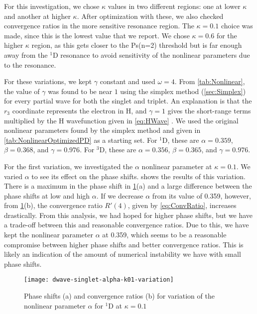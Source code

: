 \documentclass[Dissertation.tex]{subfiles}
\begin{document}
For this investigation, we chose $\kappa$ values in two different regions:
one at lower $\kappa$ and another at higher $\kappa$. After optimization with
these, we also checked convergence ratios in the more sensitive resonance
region. The $\kappa = 0.1$ choice
was made, since this is the lowest value that we report. We chose $\kappa = 0.6$
for the higher $\kappa$ region, as this gets closer to the Ps(n=2) threshold
but is far enough away from the $^1$D resonance to avoid sensitivity of the
nonlinear parameters due to the resonance.

For these variations, we kept $\gamma$ constant and used $\omega = 4$. From 
\cref{tab:Nonlinear}, the value of $\gamma$ was found to be near $1$ using 
the simplex method (\cref{sec:Simplex}) for every partial wave for both the 
singlet and triplet. An explanation is that the $r_3$ coordinate represents 
the electron in H, and $\gamma = 1$ gives the short-range terms multiplied by 
the H wavefunction given in \cref{eq:HWave} \cite{VanReethPrivate}. We used the
original nonlinear parameters found by the simplex method and given in
\cref{tab:NonlinearOptimizedPD} as a starting set. For
$^1$D, these are $\alpha = 0.359$, $\beta = 0.368$, and $\gamma = 0.976$. For
$^3$D, these are $\alpha = 0.356$, $\beta = 0.365$, and $\gamma = 0.976$.

For the first variation, we investigated the $\alpha$ nonlinear parameter at
$\kappa = 0.1$. We varied $\alpha$ to see its effect on the phase shifts.
 shows the results of this
variation. There is a maximum in the phase shift in 
\cref{fig:dwave-singlet-alpha-k01-variation}(a) and a large difference between
the phase shifts at low and high $\alpha$. If we decrease
$\alpha$ from its value of 0.359, however, from
\cref{fig:dwave-singlet-alpha-k01-variation}(b),
the convergence ratio $R'(4)$, given by \cref{eq:ConvRatio},
increases drastically. From this analysis, we had hoped for higher phase shifts,
but we have a trade-off between this and reasonable convergence ratios. Due to
this, we have kept the nonlinear parameter $\alpha$ at 0.359, which seems to be
a reasonable compromise between higher phase shifts and better convergence
ratios. This is likely an indication of the amount of numerical instability
we have with small phase shifts.


\begin{figure}
	\centering
	\texttt{[image: dwave-singlet-alpha-k01-variation]}
	\caption[Variation of the nonlinear parameter $\alpha$ for $^{1}$D at $\kappa = 0.1$]{Phase shifts (a) and convergence ratios (b) for variation of the nonlinear parameter $\alpha$ for $^{1}$D at $\kappa = 0.1$}
	\label{fig:dwave-singlet-alpha-k01-variation}
\end{figure}
\end{document}
